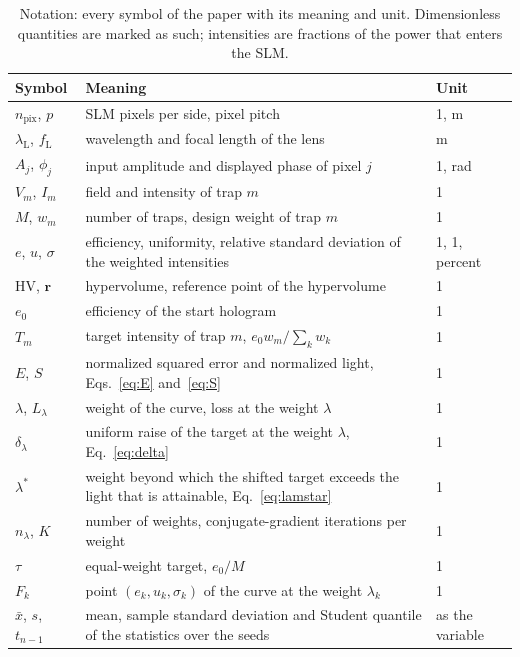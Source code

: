 \begin{table}[t]
\centering\small
\caption{Notation: every symbol of the paper with its meaning and unit. Dimensionless quantities are marked as such; intensities are fractions of the power that enters the SLM.}
\label{tab:notation}
\begin{tabular}{@{}l p{8.6cm} l@{}}
\toprule
Symbol & Meaning & Unit\\
\midrule
$n_{\mathrm{pix}}$, $p$ & SLM pixels per side, pixel pitch & 1, m\\
$\lambda_{\mathrm L}$, $f_{\mathrm L}$ & wavelength and focal length of the lens & m\\
$A_j$, $\phi_j$ & input amplitude and displayed phase of pixel $j$ & 1, rad\\
$V_m$, $I_m$ & field and intensity of trap $m$ & 1\\
$M$, $w_m$ & number of traps, design weight of trap $m$ & 1\\
$e$, $u$, $\sigma$ & efficiency, uniformity, relative standard deviation of the weighted intensities & 1, 1, percent\\
$\mathrm{HV}$, $\mathbf r$ & hypervolume, reference point of the hypervolume & 1\\
$e_0$ & efficiency of the start hologram & 1\\
$T_m$ & target intensity of trap $m$, $e_0w_m/\sum_kw_k$ & 1\\
$E$, $S$ & normalized squared error and normalized light, Eqs.~\ref{eq:E} and~\ref{eq:S} & 1\\
$\lambda$, $L_\lambda$ & weight of the curve, loss at the weight $\lambda$ & 1\\
$\delta_\lambda$ & uniform raise of the target at the weight $\lambda$, Eq.~\ref{eq:delta} & 1\\
$\lambda^\ast$ & weight beyond which the shifted target exceeds the light that is attainable, Eq.~\ref{eq:lamstar} & 1\\
$n_\lambda$, $K$ & number of weights, conjugate-gradient iterations per weight & 1\\
$\tau$ & equal-weight target, $e_0/M$ & 1\\
$F_k$ & point $(e_k,u_k,\sigma_k)$ of the curve at the weight $\lambda_k$ & 1\\
$\bar x$, $s$, $t_{n-1}$ & mean, sample standard deviation and Student quantile of the statistics over the seeds & as the variable\\
\bottomrule
\end{tabular}
\end{table}
